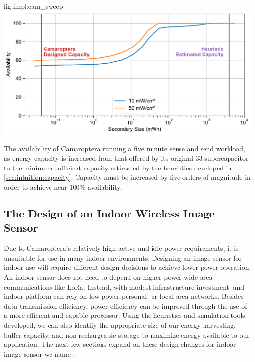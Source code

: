 \begin{definefigure}{fig:impl:cam_sweep}
    \centering
    \includegraphics[width=\linewidth]{figs/chap6/camaroptera_simulation.pdf}
    \caption{
        The availability of Camaroptera running a five minute sense and send workload, as energy capacity is increased from that offered by its original 33\ssi{\milli\farad} supercapacitor to the minimum sufficient capacity estimated by the heuristics developed in \cref{sec:intuition:capacity}.
        Capacity must be increased by five orders of magnitude in order to achieve near 100\% availability.
     }
\end{definefigure}

\subsection{The Design of an Indoor Wireless Image Sensor}
Due to Camaroptera's relatively high active and idle power requirements, it is unsuitable for use in many indoor environments. 
Designing an image sensor for indoor use will require different design decisions to achieve lower power operation.
An indoor sensor does not need to depend on higher power wide-area communications like LoRa. Instead, with  modest infrastructure investment, and indoor platform can rely on low power personal- or local-area networks.
Besides data transmission efficiency, power efficiency can be improved through the use of a more efficient and capable processor.
Using the heuristics and simulation tools developed, we can also identify the appropriate size of our energy harvesting, buffer capacity, and non-rechargeable storage to maximize energy available to our application. 
The next few sections expand on these design changes for indoor image sensor we name \namec.

